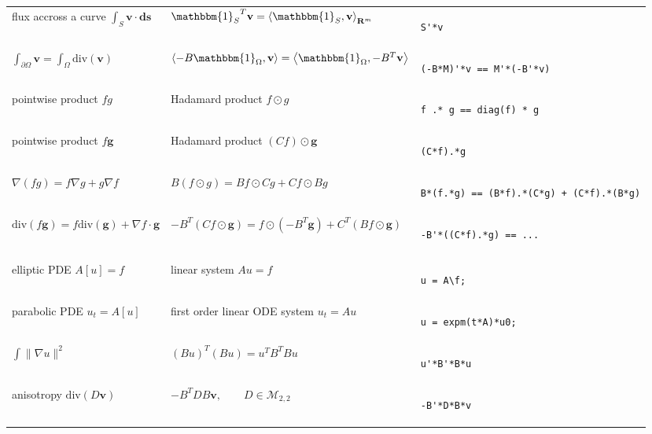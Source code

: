 \documentclass{article}
\def\R{\mathbf{R}}
\begin{document}
\begin{tabular}{l|l|b{}}
flux accross a curve $\int_{S}\mathbf{v}\cdot\mathbf{ds}$ &
${\mathbbm{1}_S}^T\mathbf{v} = \left\langle\mathbbm{1}_S,\mathbf{v}\right\rangle_{\R^m}$ &
\begin{verbatim}
S'*v
\end{verbatim}
\\
$\int_{\partial\Omega}\mathbf{v}=\int_\Omega\mathrm{div}(\mathbf{v})$ &
$\left\langle -B\mathbbm{1}_{\Omega},\mathbf{v}\right\rangle=\left\langle\mathbbm{1}_\Omega,-B^T\mathbf{v}\right\rangle$ &
\begin{verbatim}
(-B*M)'*v == M'*(-B'*v)
\end{verbatim}
\\
pointwise product $fg$ & Hadamard product $f\odot g$ &
\begin{verbatim}
f .* g == diag(f) * g
\end{verbatim}
\\
pointwise product $f\mathbf{g}$ & Hadamard product $(Cf)\odot\mathbf{g}$ &
\begin{verbatim}
(C*f).*g
\end{verbatim}
\\
$\nabla(fg)=f\nabla g+g\nabla f$ &
$B(f\odot g)= Bf\odot Cg+Cf\odot Bg$ &
\begin{verbatim}
B*(f.*g) == (B*f).*(C*g) + (C*f).*(B*g)
\end{verbatim}
\\
$\mathrm{div}(f\mathbf{g})=f\mathrm{div}(\mathbf{g})+\nabla f\cdot\mathbf{g}$ &
$-B^T(Cf\odot\mathbf{g})= f\odot (-B^T\mathbf{g})+C^T\left(Bf\odot\mathbf{g}\right)$ &
\begin{verbatim}
-B'*((C*f).*g) == ...
\end{verbatim}
\\
&&\\
elliptic PDE $A[u]=f$ &
linear system $Au=f$ &
\begin{verbatim}
u = A\f;
\end{verbatim}
\\
parabolic PDE $u_t=A[u]$ &
first order linear ODE system $u_t=Au$ &
\begin{verbatim}
u = expm(t*A)*u0;
\end{verbatim}
\\
$\int\|\nabla u\|^2$ &
$(Bu)^T(Bu)=u^TB^TBu$ &
\begin{verbatim}
u'*B'*B*u
\end{verbatim}
\\
anisotropy $\mathrm{div}(D\mathbf{v})$ &
$-B^TDB\mathbf{v},\qquad D\in\mathcal{M}_{2,2}$ &
\begin{verbatim}
-B'*D*B*v
\end{verbatim}
\\
\end{tabular}
\end{document}
